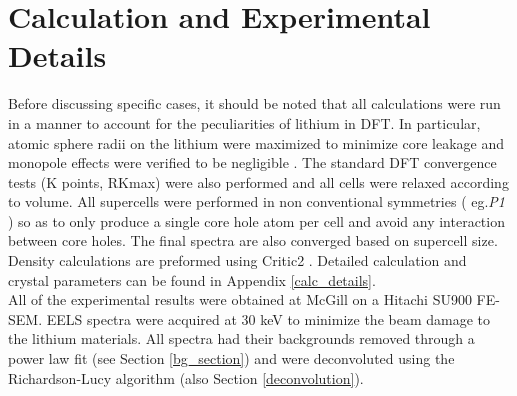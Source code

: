 \section{Calculation and Experimental Details} \label{calc_section}
Before discussing specific cases, it should be noted that all calculations were run in a manner to account for the peculiarities of lithium in DFT. In particular, atomic sphere radii on the lithium were maximized to minimize core leakage and monopole effects were verified to be negligible \cite{mauchamp_ab_2006}.  The standard DFT convergence tests (K points, RKmax) were also performed and all cells were relaxed according to volume.  All supercells were performed in non conventional symmetries ( eg.\textit{P1} ) so as to only produce a single core hole atom per cell and avoid any interaction between core holes. The final spectra are also converged based on supercell size.  Density calculations are preformed using Critic2 \cite{critic2}.   Detailed calculation and crystal parameters can be found in Appendix \ref{calc_details}. \\



All of the experimental results were obtained at McGill on a Hitachi SU900 FE-SEM.  EELS spectra were acquired at 30 keV to minimize the beam damage to the lithium materials.  All spectra had their backgrounds removed through a power law fit (see Section \ref{bg_section}) and were deconvoluted using the Richardson-Lucy algorithm (also Section \ref{deconvolution}).

